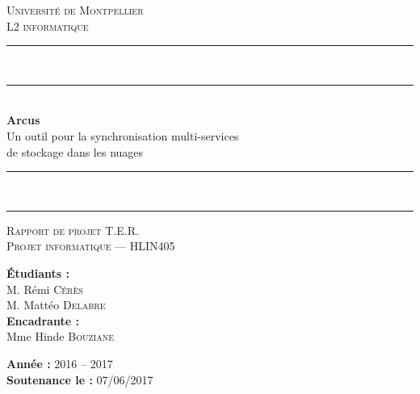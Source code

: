 \begin{titlepage}
    \centering

    {\scshape
        {\huge Université de Montpellier}\\[.5em]
        {\LARGE L2 informatique}
    }

    \vfill

    \rule{\linewidth}{0.25mm}\\[-.9em]
    \rule{\linewidth}{0.5mm}\\
    \vspace{.5cm}
    {
        {\bfseries\huge Arcus}\\[1em]
        {\LARGE Un outil pour la synchronisation multi-services\\de stockage dans les nuages}
    }\\


    \vspace{.25cm}
    \rule{\linewidth}{0.5mm}\\[-.95em]
    \rule{\linewidth}{0.25mm}
    \vspace{1cm}

    {\large\scshape
        Rapport de projet T.E.R.\\
        Projet informatique --- HLIN405
    }

    \vfill

    \begin{minipage}{0.495\textwidth}
        \begin{flushleft}\large
            \textbf{Étudiants :}\\
            M. Rémi \textsc{Cérès}\\
            M. Mattéo \textsc{Delabre}\\[1em]
            \textbf{Encadrante :}\\
            Mme Hinde \textsc{Bouziane}
        \end{flushleft}
    \end{minipage}
    \begin{minipage}{0.495\textwidth}
        \begin{flushright}\large
            \textbf{Année :} 2016 -- 2017\\
            \textbf{Soutenance le :} 07/06/2017
        \end{flushright}
    \end{minipage}

    \vfill

    \newcommand{\logo}[2]{
        \raisebox{-.5\height}{
            \texttt{[image: \#1]}
        }
    }

    \logo{figures/frontpage-logo-um.png}{0.5}
    \logo{figures/frontpage-logo-fds.png}{0.25}
    \logo{figures/frontpage-logo-cgi.png}{0.05}
    \logo{figures/frontpage-logo-figure.png}{1}
\end{titlepage}
